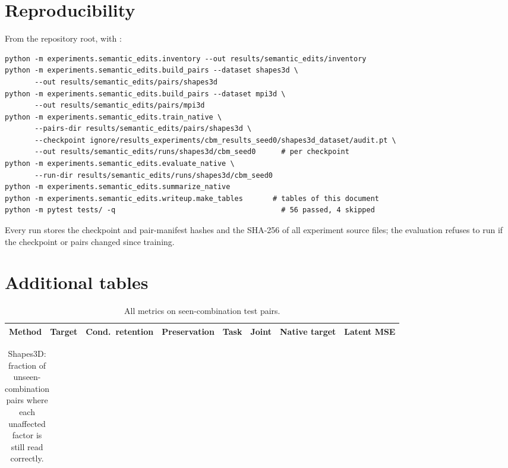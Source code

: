 \documentclass[11pt,a4paper]{article}
\newcommand{\code}[1]{\texttt{\detokenize{#1}}}
\begin{document}
\section{Reproducibility}

From the repository root, with \code{.venv}:
\begin{verbatim}
python -m experiments.semantic_edits.inventory --out results/semantic_edits/inventory
python -m experiments.semantic_edits.build_pairs --dataset shapes3d \
       --out results/semantic_edits/pairs/shapes3d
python -m experiments.semantic_edits.build_pairs --dataset mpi3d \
       --out results/semantic_edits/pairs/mpi3d
python -m experiments.semantic_edits.train_native \
       --pairs-dir results/semantic_edits/pairs/shapes3d \
       --checkpoint ignore/results_experiments/cbm_results_seed0/shapes3d_dataset/audit.pt \
       --out results/semantic_edits/runs/shapes3d/cbm_seed0      # per checkpoint
python -m experiments.semantic_edits.evaluate_native \
       --run-dir results/semantic_edits/runs/shapes3d/cbm_seed0
python -m experiments.semantic_edits.summarize_native
python -m experiments.semantic_edits.writeup.make_tables       # tables of this document
python -m pytest tests/ -q                                       # 56 passed, 4 skipped
\end{verbatim}
Every run stores the checkpoint and pair-manifest hashes and the SHA-256 of all experiment source files; the
evaluation refuses to run if the checkpoint or pairs changed since training.

\appendix
\section{Additional tables}

\begin{table}[H]
\centering\footnotesize
\begin{tabular}{lrrrrrrr}
\toprule
Method & Target & Cond.\ retention & Preservation & Task & Joint & Native target & Latent MSE \\
\midrule

\bottomrule
\end{tabular}
\caption{All metrics on seen-combination test pairs.}
\end{table}

\begin{table}[H]
\centering\footnotesize
\begin{tabular}{lrrrrr}
\toprule
 \\
\midrule

\bottomrule
\end{tabular}
\caption{Shapes3D: fraction of unseen-combination pairs where each unaffected factor is still read correctly.}
\label{tab:perfactor-s}
\end{table}
\end{document}
